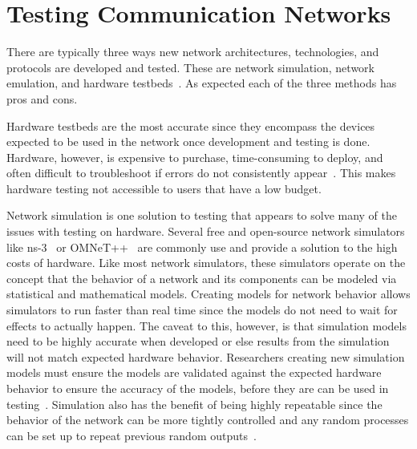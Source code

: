 \section{Testing Communication Networks} %
There are typically three ways new network architectures, technologies, and protocols are developed and tested. These are network simulation, network emulation, and hardware testbeds~\cite{simulation_emulation}.
As expected each of the three methods has pros and cons.\par
Hardware testbeds are the most accurate since they encompass the devices expected to be used in the network once development and testing is done.
Hardware, however, is expensive to purchase, time-consuming to deploy, and often difficult to troubleshoot if errors do not consistently appear~\cite{nsclick}.
This makes hardware testing not accessible to users that have a low budget.\par
Network simulation is one solution to testing that appears to solve many of the issues with testing on hardware.
Several free and open-source network simulators like ns-3~\cite{ns3} or OMNeT++~\cite{omnet++} are commonly use and provide a solution to the high costs of hardware.
Like most network simulators, these simulators operate on the concept that the behavior of a network and its components can be modeled via statistical and mathematical models.
Creating models for network behavior allows simulators to run faster than real time since the models do not need to wait for effects to actually happen.
The caveat to this, however, is that simulation models need to be highly accurate when developed or else results from the simulation will not match expected hardware behavior.
Researchers creating new simulation models must ensure the models are validated against the expected hardware behavior to ensure the accuracy of the models, before they are can be used in testing~\cite{omnet_manager}.
Simulation also has the benefit of being highly repeatable since the behavior of the network can be more tightly controlled and any random processes can be set up to repeat previous random outputs~\cite{simulation_emulation}.\par
